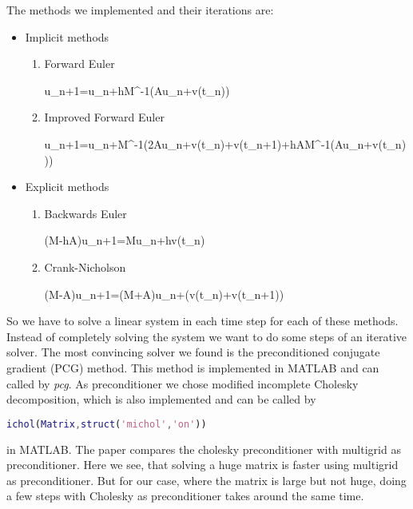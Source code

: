 The methods we implemented and their iterations are:
\begin{itemize}
	\item Implicit methods
	\begin{enumerate}[label=\arabic*.)]
		\item Forward Euler
		\begin{flalign*}
			u_{n+1}=u_n+hM^{-1}(Au_n+v(t_n))
		\end{flalign*}
		\item Improved Forward Euler
		\begin{flalign*}
			u_{n+1}=u_n+M^{-1}\left(2Au_n+v(t_n)+v(t_{n+1})+hA\cdot M^{-1}\left(Au_n+v(t_n)\right)\right)
		\end{flalign*}
	\end{enumerate}
	\item Explicit methods
	\begin{enumerate}[resume,label=\arabic*.)]
		\item Backwards Euler
		\begin{flalign*}
			(M-hA)u_{n+1}=Mu_n+hv(t_n)
		\end{flalign*}
		\item Crank-Nicholson
		\begin{flalign*}
			(M-A)u_{n+1}=(M+\frac{h}{2}A)u_n+(v(t_n)+v(t_{n+1}))
		\end{flalign*}
	\end{enumerate}
\end{itemize}
So we have to solve a linear system in each time step for each of these methods. Instead of completely solving the system we want to do some steps of an iterative solver. The most convincing solver we found is the preconditioned conjugate gradient (PCG) method. This method is implemented in MATLAB and can called by \emph{pcg}. As preconditioner we chose modified incomplete Cholesky decomposition, which is also implemented and can be called by
\begin{lstlisting}[language=matlab]
	ichol(Matrix,struct('michol','on'))
\end{lstlisting}
in MATLAB. The paper \cite{tatebe1993multigrid} compares the cholesky preconditioner with multigrid as preconditioner. Here we see, that solving a huge matrix is faster using multigrid as preconditioner. But for our case, where the matrix is large but not huge, doing a few steps with Cholesky as preconditioner takes around the same time.
